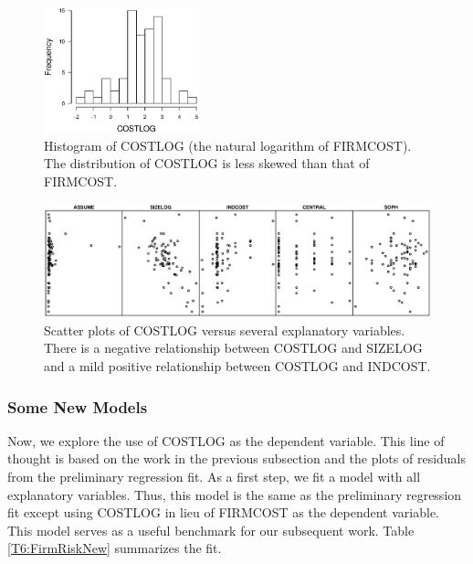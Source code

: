 \begin{figure}[htp]
  \begin{center}
   \includegraphics[width=0.4\textwidth]{Chapter6/F6HistCostLog.eps}
    \caption{\label{F6:HistCostLog} \small {Histogram of COSTLOG (the
    natural logarithm of FIRMCOST). The distribution of COSTLOG is
    less skewed than that of FIRMCOST.}}
  \end{center}
\end{figure}

\begin{figure}[htp]
  \begin{center}
   \includegraphics[width=1\textwidth]{Chapter6/F6CostLogPlots.eps}
    \caption{\label{F6:CostLogPlots}
    \small {Scatter plots of COSTLOG versus several explanatory variables.
    There is a negative relationship between COSTLOG and SIZELOG and
    a mild positive relationship between COSTLOG and INDCOST.}}
  \end{center}
\end{figure}

\bigskip

\subsubsection*{Some New Models}

Now, we explore the use of COSTLOG as the dependent variable. This
line of thought is based on the work in the previous subsection and
the plots of residuals from the preliminary regression fit. As a
first step, we fit a model with all explanatory variables. Thus,
this model is the same as the preliminary regression fit except
using COSTLOG in lieu of FIRMCOST as the dependent variable. This
model serves as a useful benchmark for our subsequent work. Table
\ref{T6:FirmRiskNew} summarizes the fit.


